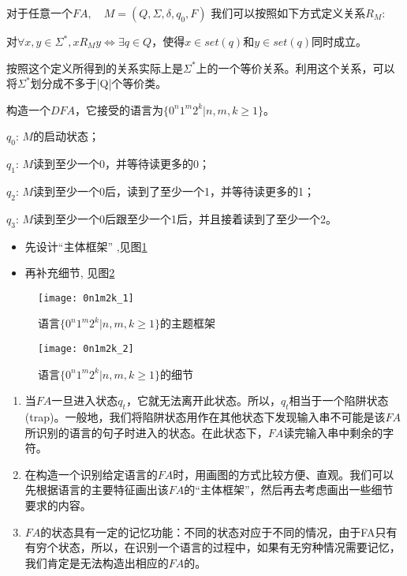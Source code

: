 对于任意一个$FA,\quad M=(Q,\Sigma,\delta,q_0,F)$ 我们可以按照如下方式定义关系$R_M$:

对$\forall x,y\in\Sigma^{\ast},xR_My \Leftrightarrow \exists q\in Q$，使得$x\in set(q)$和$y\in set(q)$同时成立。

按照这个定义所得到的关系实际上是$\Sigma^{\ast}$上的一个等价关系。利用这个关系，可以将$\Sigma^{\ast}$划分成不多于|Q|个等价类。 

\begin{example}
	构造一个$DFA$，它接受的语言为$\{0^n1^m2^k|n,m,k\ge 1\}$。 
	
	$q_0$: $M$的启动状态；
	
	$q_1$: $M$读到至少一个0，并等待读更多的0；
	
	$q_2$: $M$读到至少一个0后，读到了至少一个1，并等待读更多的1；
	
	$q_3$: $M$读到至少一个0后跟至少一个1后，并且接着读到了至少一个2。 
	\begin{itemize}
		\item 先设计“主体框架” ,见图\ref{fig:0n1m2k_1}
		\item 再补充细节, 见图\ref{fig:0n1m2k_2}
	\end{itemize}
	\begin{figure}[htbp]
		\texttt{[image: 0n1m2k\_1]}
		\caption{语言$\{0^n1^m2^k|n,m,k\ge 1\}$的主题框架}
		\label{fig:0n1m2k_1}       %
	\end{figure}

	\begin{figure}[htbp]
		\texttt{[image: 0n1m2k\_2]}
		\caption{语言$\{0^n1^m2^k|n,m,k\ge 1\}$的细节}
		\label{fig:0n1m2k_2}       %
	\end{figure}
\end{example}

\begin{enumerate}
	\item 当$FA$一旦进入状态$q_t$，它就无法离开此状态。所以，$q_t$相当于一个陷阱状态(trap)。一般地，我们将陷阱状态用作在其他状态下发现输入串不可能是该$FA$所识别的语言的句子时进入的状态。在此状态下，$FA$读完输入串中剩余的字符。 
	\item  在构造一个识别给定语言的$FA$时，用画图的方式比较方便、直观。我们可以先根据语言的主要特征画出该$FA$的“主体框架”，然后再去考虑画出一些细节要求的内容。
	\item $FA$的状态具有一定的记忆功能：不同的状态对应于不同的情况，由于FA只有有穷个状态，所以，在识别一个语言的过程中，如果有无穷种情况需要记忆，我们肯定是无法构造出相应的$FA$的。 	
\end{enumerate}

